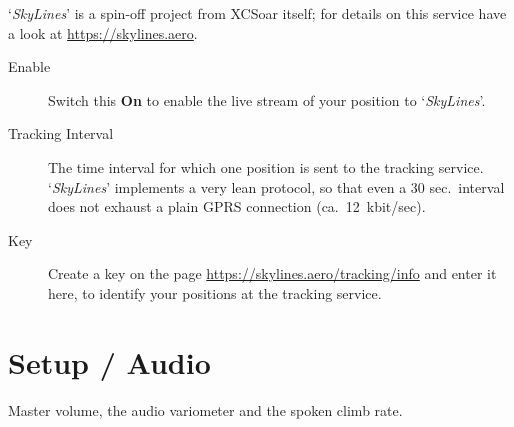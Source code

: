 `{\em SkyLines}' is a spin-off project from XCSoar itself; for details on this
service have a look at \url{https://skylines.aero}.

\begin{description}
\item[Enable]  Switch this {\bf On} to enable the live stream of 
  your position to `{\em SkyLines}'.
\item[Tracking Interval]  The time interval for which one position is sent to
  the tracking service. `{\em SkyLines}' implements a very lean protocol, so that even
  a 30 sec.\ interval does not exhaust a plain GPRS connection (ca.\ 12~kbit/sec).
\item[Key]  Create a key on the page \url{https://skylines.aero/tracking/info} 
  and enter it here, to identify your positions at the tracking service.
\end{description}


\section{Setup / Audio}\label{sec:audiovario-gauge}

Master volume, the audio variometer and the spoken climb
rate. \label{conf:audiovariogauge}

